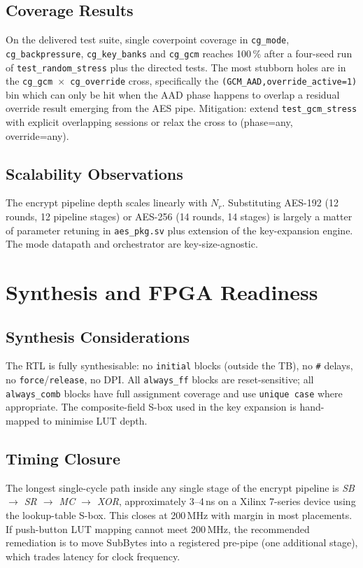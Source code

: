 \documentclass[conference,10pt,a4paper]{IEEEtran}
\begin{document}
\subsection{Coverage Results}
On the delivered test suite, single coverpoint coverage in
\texttt{cg\_mode}, \texttt{cg\_backpressure}, \texttt{cg\_key\_banks}
and \texttt{cg\_gcm} reaches 100\,\% after a four-seed run of
\texttt{test\_random\_stress} plus the directed tests.  The most
stubborn holes are in the
\texttt{cg\_gcm $\times$ cg\_override} cross, specifically the
\texttt{(GCM\_AAD,override\_active=1)} bin which can only be hit when
the AAD phase happens to overlap a residual override result emerging
from the AES pipe.  Mitigation: extend \texttt{test\_gcm\_stress} with
explicit overlapping sessions or relax the cross to (phase=any,
override=any).

\subsection{Scalability Observations}
The encrypt pipeline depth scales linearly with $N_r$.  Substituting
AES-192 (12 rounds, 12 pipeline stages) or AES-256 (14 rounds, 14
stages) is largely a matter of parameter retuning in
\texttt{aes\_pkg.sv} plus extension of the key-expansion engine.  The
mode datapath and orchestrator are key-size-agnostic.

\section{Synthesis and FPGA Readiness}
\label{sec:fpga}

\subsection{Synthesis Considerations}
The RTL is fully synthesisable: no \texttt{initial} blocks (outside the
TB), no \texttt{\#} delays, no \texttt{force}/\texttt{release}, no DPI.
All \texttt{always\_ff} blocks are reset-sensitive; all
\texttt{always\_comb} blocks have full assignment coverage and use
\texttt{unique case} where appropriate.  The composite-field S-box used
in the key expansion is hand-mapped to minimise LUT depth.

\subsection{Timing Closure}
The longest single-cycle path inside any single stage of the encrypt
pipeline is \textit{SB $\to$ SR $\to$ MC $\to$ XOR}, approximately
3--4\,ns on a Xilinx 7-series device using the lookup-table S-box.
This closes at 200\,MHz with margin in most placements.  If push-button
LUT mapping cannot meet 200\,MHz, the recommended remediation is to
move SubBytes into a registered pre-pipe (one additional stage), which
trades latency for clock frequency.
\end{document}
